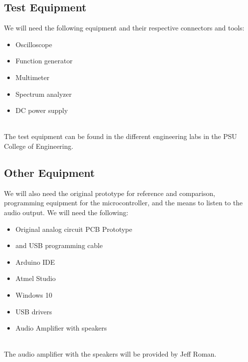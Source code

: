 \documentclass[a4paper,12pt]{article}
\begin{document}
	\subsection{Test Equipment}
	We will need the following equipment and their respective connectors and tools:
	\begin{itemize}
	\item Oscilloscope
	\item Function generator
	\item Multimeter
	\item Spectrum analyzer
	\item DC power supply
	\end{itemize}
	\\The test equipment can be found in the different engineering labs in the PSU College of Engineering. 
	
	\subsection{Other Equipment}
	We will also need the original prototype for reference and comparison, programming equipment for the microcontroller, and the means to listen to the audio output. We will need the following:
	\begin{itemize}
	\item Original analog circuit PCB Prototype
	\item and USB programming cable
	\item Arduino IDE
	\item Atmel Studio
	\item Windows 10
	\item USB drivers
	\item Audio Amplifier with speakers
	\end{itemize}
	\\The audio amplifier with the speakers will be provided by Jeff Roman.
	\subsection*{}
\end{document}
